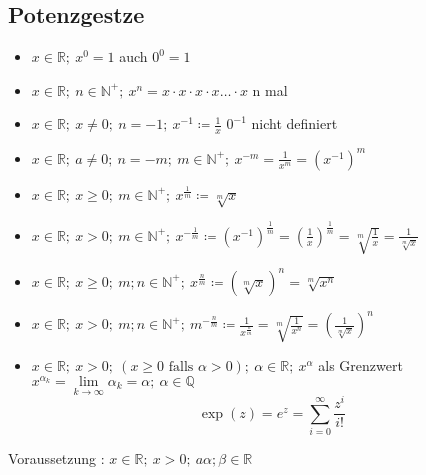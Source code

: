 \documentclass[12pt,a4paper]{article}
\begin{document}
\subsection{Potenzgestze}
\begin{itemize}
	\item $x \in \mathbb{R};\ x^0 = 1$ auch $0^0=1$
	\item $x \in \mathbb{R};\ n \in \mathbb{N}^+;\ x^n = x \cdot x \cdot x \cdot x \dots \cdot x$ n mal
	\item $x \in \mathbb{R};\ x \not = 0;\ n = -1;\ x^{-1} \coloneqq \frac{1}{x}$ $0^{-1}$ nicht definiert
	\item $x \in \mathbb{R};\ a \not = 0;\ n = -m;\ m \in \mathbb{N}^+;\ x^{-m} = \frac{1}{x^{m}} = (x^{-1})^m$
	\item $x \in \mathbb{R};\ x \geq 0;\ m \in \mathbb{N}^+;\ x^{\frac{1}{m}} \coloneqq \sqrt[m]{x}$
	\item $x \in\mathbb{R};\ x > 0;\ m \in \mathbb{N}^+;\ x^{-\frac{1}{m}} \coloneqq (x^{-1})^{\frac{1}{m}}= (\frac{1}{x})^{\frac{1}{m}}=\sqrt[m]{\frac{1}{x}} = \frac{1}{\sqrt[m]{x}}$
	\item $x \in\mathbb{R};\ x \geq 0;\ m;n \in \mathbb{N}^+;\ x^{\frac{n}{m}} \coloneqq \left(\sqrt[m]{x}\right)^n = \sqrt[m]{x^n}$
	\item $x \in \mathbb{R};\ x > 0;\ m;n \in \mathbb{N}^+;\ m^{-\frac{n}{m}} \coloneqq \frac{1}{x^{\frac{n}{m}}} = \sqrt[m]{\frac{1}{x^n}} = \left(\frac{1}{\sqrt[m]{x}}\right)^n$
	\item $x \in \mathbb{R};\ x > 0;\ (x \geq 0 \textrm{ falls } \alpha > 0);\ \alpha \in \mathbb{R};\ x^\alpha$ als Grenzwert $x^{\alpha_k} = \lim\limits_{k \to \infty}\alpha_k = \alpha;\ \alpha \in \mathbb{Q}$
	      $$\exp(z) = e^z = \sum\limits_{i = 0}^\infty \frac{z^i}{i!}$$
\end{itemize}
Voraussetzung : $x \in \mathbb{R};\ x > 0;\ a\alpha; \beta \in \mathbb{R}$
\end{document}
